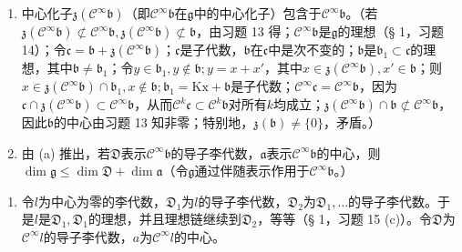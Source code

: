 \begin{enumerate}
\def\labelenumi{(\alph{enumi})}
\item
  中心化子\(\mathfrak{z}(\mathcal{C}^{\infty}\mathfrak{b})\)（即\(\mathcal{C}^{\infty}\mathfrak{b}\)在\(\mathfrak{g}\)中的中心化子）包含于\(\mathcal{C}^{\infty}\mathfrak{b}\)。（若\(\mathfrak{z}(\mathcal{C}^{\infty}\mathfrak{b})\not\subset\mathcal{C}^{\infty}\mathfrak{b},\mathfrak{z}(\mathcal{C}^{\infty}\mathfrak{b})\not\subset\mathfrak{b}\)，由习题 13 得；\(\mathcal{C}^{\infty}\mathfrak{b}\)是\(\mathfrak{g}\)的理想（§ 1，习题 14）；令\(\mathfrak{c}=\mathfrak{b}+\mathfrak{z}(\mathcal{C}^{\infty}\mathfrak{b})\)；\(\mathfrak{c}\)是子代数，\(\mathfrak{b}\)在\(\mathfrak{c}\)中是次不变的；\(\mathfrak{b}\)是\(\mathfrak{b}_{1}\subset\mathfrak{c}\)的理想，其中\(\mathfrak{b}\neq\mathfrak{b}_{1}\)；令\(y\in\mathfrak{b}_{1},y\notin\mathfrak{b};y=x+x'\)，其中\(x\in\mathfrak{z}(\mathcal{C}^{\infty}\mathfrak{b}),x'\in\mathfrak{b}\)；则\(x\in\mathfrak{z}(\mathcal{C}^{\infty}\mathfrak{b})\cap\mathfrak{b}_{1},x\notin\mathfrak{b};\mathfrak{b}_{1}=\mathrm{Kx}+\mathfrak{b}\)是子代数；\(\mathcal{C}^{\infty}\mathfrak{c}=\mathcal{C}^{\infty}\mathfrak{b}\)，因为\(\mathfrak{c}\cap\mathfrak{z}(\mathcal{C}^{\infty}\mathfrak{b})\subset\mathcal{C}^{\infty}\mathfrak{b}\)，从而\(\mathcal{C}^{k}\mathfrak{c}\subset\mathcal{C}^{k}\mathfrak{b}\)对所有\(k\)均成立；\(\mathfrak{z}(\mathcal{C}^{\infty}\mathfrak{b})\cap\mathfrak{b}\not\subset\mathcal{C}^{\infty}\mathfrak{b}\)，因此\(\mathfrak{b}\)的中心由习题 13 知非零；特别地，\(\mathfrak{z}(\mathfrak{b})\neq\{0\}\)，矛盾。）
\item
  由 (a) 推出，若\(\mathfrak{D}\)表示\(\mathcal{C}^{\infty}\mathfrak{b}\)的导子李代数，\(\mathfrak{a}\)表示\(\mathcal{C}^{\infty}\mathfrak{b}\)的中心，则\(\dim \mathfrak{g} \leqslant \dim \mathfrak{D} + \dim \mathfrak{a}\)（令\(\mathfrak{g}\)通过伴随表示作用于\(\mathcal{C}^{\infty}\mathfrak{b}\)。）
\end{enumerate}

\begin{enumerate}
\def\labelenumi{\arabic{enumi}.}
\setcounter{enumi}{14}
\tightlist
\item
  令\(l\)为中心为零的李代数，\(\mathfrak{D}_1\)为\(l\)的导子李代数，\(\mathfrak{D}_2\)为\(\mathfrak{D}_1, \ldots\)的导子李代数。于是\(l\)是\(\mathfrak{D}_1, \mathfrak{D}_1\)的理想，并且理想链继续到\(\mathfrak{D}_2\)，等等（§ 1，习题 15 (c)）。令\(\mathfrak{D}\)为\(\mathcal{C}^\infty l\)的导子李代数，\(a\)为\(\mathcal{C}^\infty l\)的中心。
\end{enumerate}

